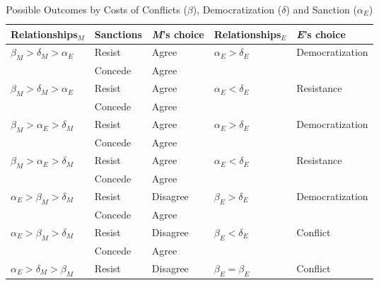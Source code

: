 \documentclass[11pt]{article}
\begin{document}
\begin{table}[!ht]
	\centering
	\caption{Possible Outcomes by Costs of Conflicts ($\beta$), Democratization ($\delta$) and Sanction ($\alpha_{E}$)}
	\footnotesize
	\vspace{0.2cm}
	\begin{tabular}{ p{3cm} p{2cm} p{2cm} p{3cm} p{3cm} }
		\toprule
		\multicolumn{1}{p{3cm}}{Relationships$_{M}$} & \multicolumn{1}{p{2cm}}{Sanctions} & \multicolumn{1}{p{2cm}}{\textit{M}'s choice} & \multicolumn{1}{p{3cm}}{Relationships$_{E}$} & \multicolumn{1}{p{3cm}}{\textit{E}'s choice} \\
		\midrule
		\rowcolor{Gray}
		$\beta_{M} > \delta_{M} > \alpha_{E}$	& Resist   & Agree    & $\alpha_{E} > \delta_{E}$ & Democratization\\
		\rowcolor{Gray}
		                                      & Concede  & Agree    &                           &                \\
    $\beta_{M} > \delta_{M} > \alpha_{E}$	& Resist   & Agree    & $\alpha_{E} < \delta_{E}$ & Resistance     \\
		                                      & Concede  & Agree    &                           &                \\
    \rowcolor{Gray}
		$\beta_{M} > \alpha_{E} > \delta_{M}$	& Resist   & Agree    & $\alpha_{E} > \delta_{E}$ & Democratization\\
		\rowcolor{Gray}
		                                      & Concede  & Agree    &                           &                \\
		$\beta_{M} > \alpha_{E} > \delta_{M}$	& Resist   & Agree    & $\alpha_{E} < \delta_{E}$ & Resistance     \\
		                                      & Concede  & Agree    &                           &                \\
		\rowcolor{Gray}
    $\alpha_{E} > \beta_{M} > \delta_{M}$	& Resist   & Disagree & $\beta_{E} > \delta_{E}$  & Democratization\\
    \rowcolor{Gray}
		                                      & Concede  & Agree    &                           &                \\
    $\alpha_{E} > \beta_{M} > \delta_{M}$	& Resist   & Disagree & $\beta_{E} < \delta_{E}$  & Conflict     \\
                                          & Concede  & Agree    &                           &                \\
		$\alpha_{E} > \delta_{M} > \beta_{M}$	& Resist   & Disagree  & $\beta_{E} = \beta_{E}$   & Conflict \\

\end{tabular}
\end{table}
\end{document}
